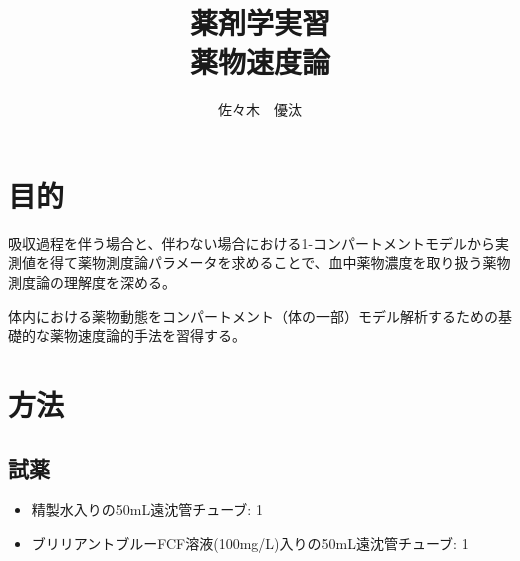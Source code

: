 \documentclass{jsarticle}
\begin{document}
\title{薬剤学実習\\薬物速度論}
\author{佐々木　優汰}
\maketitle
\tableofcontents

\section{目的}
吸収過程を伴う場合と、伴わない場合における1-コンパートメントモデルから実測値を得て薬物測度論パラメータを求めることで、血中薬物濃度を取り扱う薬物測度論の理解度を深める。

体内における薬物動態をコンパートメント（体の一部）モデル解析するための基礎的な薬物速度論的手法を習得する。

\section{方法}
\subsection{試薬}
\begin{itemize}
    \item 精製水入りの50mL遠沈管チューブ: 1
    \item ブリリアントブルーFCF溶液(100mg/L)入りの50mL遠沈管チューブ: 1
\end{itemize}
\end{document}
